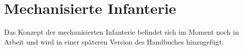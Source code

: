 \section{Mechanisierte Infanterie}
Das Konzept der mechanisierten Infanterie befindet sich im Moment noch in Arbeit und wird in einer späteren Version des Handbuches hinzugefügt.